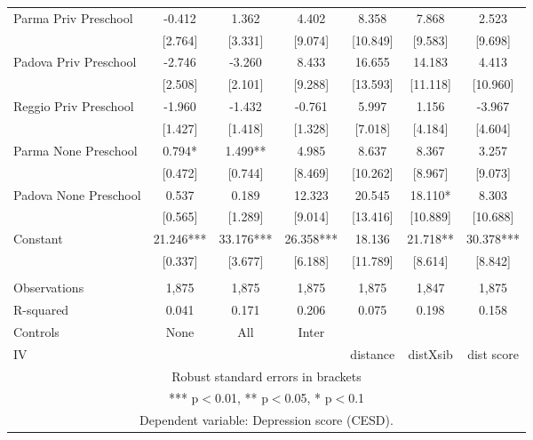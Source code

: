 \begin{tabular}{lcccccc}
Parma Priv Preschool & -0.412 & 1.362 & 4.402 & 8.358 & 7.868 & 2.523 \\
 & [2.764] & [3.331] & [9.074] & [10.849] & [9.583] & [9.698] \\
Padova Priv Preschool & -2.746 & -3.260 & 8.433 & 16.655 & 14.183 & 4.413 \\
 & [2.508] & [2.101] & [9.288] & [13.593] & [11.118] & [10.960] \\
Reggio Priv Preschool & -1.960 & -1.432 & -0.761 & 5.997 & 1.156 & -3.967 \\
 & [1.427] & [1.418] & [1.328] & [7.018] & [4.184] & [4.604] \\
Parma None Preschool & 0.794* & 1.499** & 4.985 & 8.637 & 8.367 & 3.257 \\
 & [0.472] & [0.744] & [8.469] & [10.262] & [8.967] & [9.073] \\
Padova None Preschool & 0.537 & 0.189 & 12.323 & 20.545 & 18.110* & 8.303 \\
 & [0.565] & [1.289] & [9.014] & [13.416] & [10.889] & [10.688] \\
Constant & 21.246*** & 33.176*** & 26.358*** & 18.136 & 21.718** & 30.378*** \\
 & [0.337] & [3.677] & [6.188] & [11.789] & [8.614] & [8.842] \\
 &  &  &  &  &  &  \\
Observations & 1,875 & 1,875 & 1,875 & 1,875 & 1,847 & 1,875 \\
R-squared & 0.041 & 0.171 & 0.206 & 0.075 & 0.198 & 0.158 \\
Controls & None & All & Inter &  &  &  \\
 IV &  &  &  & distance & distXsib & dist score \\ \hline
\multicolumn{7}{c}{ Robust standard errors in brackets} \\
\multicolumn{7}{c}{ *** p$<$0.01, ** p$<$0.05, * p$<$0.1} \\
\multicolumn{7}{c}{ Dependent variable: Depression score (CESD).} \\
\end{tabular}
